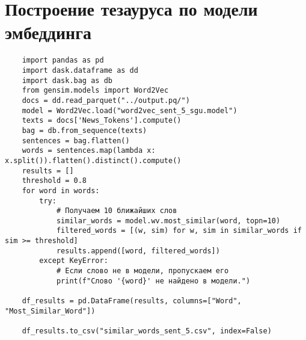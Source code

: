 \documentclass[coursework]{SCWorks}
\begin{document}
\section{Построение тезауруса по модели эмбеддинга}
\label{apx:thesaurus}
\begin{verbatim}
    import pandas as pd
    import dask.dataframe as dd
    import dask.bag as db
    from gensim.models import Word2Vec
    docs = dd.read_parquet("../output.pq/")
    model = Word2Vec.load("word2vec_sent_5_sgu.model")
    texts = docs['News_Tokens'].compute()
    bag = db.from_sequence(texts)
    sentences = bag.flatten()
    words = sentences.map(lambda x: x.split()).flatten().distinct().compute()
    results = []
    threshold = 0.8
    for word in words:
        try:
            # Получаем 10 ближайших слов
            similar_words = model.wv.most_similar(word, topn=10)
            filtered_words = [(w, sim) for w, sim in similar_words if sim >= threshold]
            results.append([word, filtered_words])
        except KeyError:
            # Если слово не в модели, пропускаем его
            print(f"Слово '{word}' не найдено в модели.")
    
    df_results = pd.DataFrame(results, columns=["Word", "Most_Similar_Word"])
    
    df_results.to_csv("similar_words_sent_5.csv", index=False)
\end{verbatim}
\end{document}
